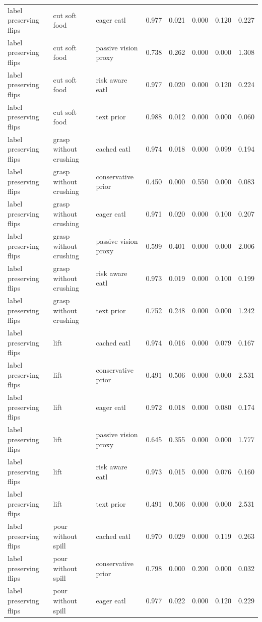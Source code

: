 \begin{longtable}{lllrrrrr}
label preserving flips & cut soft food & eager eatl & 0.977 & 0.021 & 0.000 & 0.120 & 0.227 \\
label preserving flips & cut soft food & passive vision proxy & 0.738 & 0.262 & 0.000 & 0.000 & 1.308 \\
label preserving flips & cut soft food & risk aware eatl & 0.977 & 0.020 & 0.000 & 0.120 & 0.224 \\
label preserving flips & cut soft food & text prior & 0.988 & 0.012 & 0.000 & 0.000 & 0.060 \\
\midrule
label preserving flips & grasp without crushing & cached eatl & 0.974 & 0.018 & 0.000 & 0.099 & 0.194 \\
label preserving flips & grasp without crushing & conservative prior & 0.450 & 0.000 & 0.550 & 0.000 & 0.083 \\
label preserving flips & grasp without crushing & eager eatl & 0.971 & 0.020 & 0.000 & 0.100 & 0.207 \\
label preserving flips & grasp without crushing & passive vision proxy & 0.599 & 0.401 & 0.000 & 0.000 & 2.006 \\
label preserving flips & grasp without crushing & risk aware eatl & 0.973 & 0.019 & 0.000 & 0.100 & 0.199 \\
label preserving flips & grasp without crushing & text prior & 0.752 & 0.248 & 0.000 & 0.000 & 1.242 \\
\midrule
label preserving flips & lift & cached eatl & 0.974 & 0.016 & 0.000 & 0.079 & 0.167 \\
label preserving flips & lift & conservative prior & 0.491 & 0.506 & 0.000 & 0.000 & 2.531 \\
label preserving flips & lift & eager eatl & 0.972 & 0.018 & 0.000 & 0.080 & 0.174 \\
label preserving flips & lift & passive vision proxy & 0.645 & 0.355 & 0.000 & 0.000 & 1.777 \\
label preserving flips & lift & risk aware eatl & 0.973 & 0.015 & 0.000 & 0.076 & 0.160 \\
label preserving flips & lift & text prior & 0.491 & 0.506 & 0.000 & 0.000 & 2.531 \\
\midrule
label preserving flips & pour without spill & cached eatl & 0.970 & 0.029 & 0.000 & 0.119 & 0.263 \\
label preserving flips & pour without spill & conservative prior & 0.798 & 0.000 & 0.200 & 0.000 & 0.032 \\
label preserving flips & pour without spill & eager eatl & 0.977 & 0.022 & 0.000 & 0.120 & 0.229 \\

\end{longtable}
